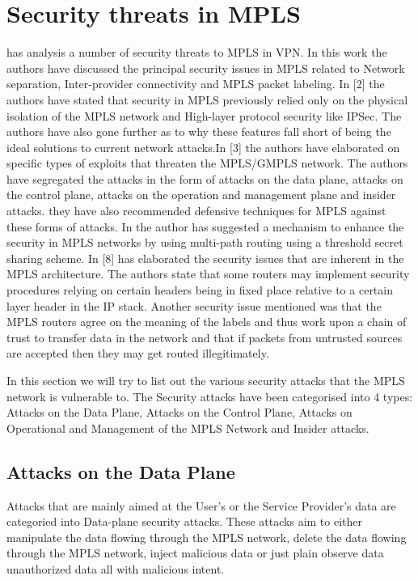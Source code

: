 \section{Security threats in MPLS}
 \cite{GRAYSON2009146} has analysis a number of security threats to MPLS in VPN. In this work the authors have discussed the principal security issues in MPLS related to Network separation, Inter-provider connectivity and MPLS packet labeling. In [2] the authors have stated that security in MPLS previously relied only on the physical isolation of the MPLS network and High-layer protocol security like IPSec. The authors have also gone further as to why these features fall short of being the ideal solutions to current network attacks.In [3] the authors have elaborated on specific types of exploits that threaten the MPLS/GMPLS network. The authors have segregated the attacks in the form of attacks on the data plane, attacks on the control plane, attacks on the operation and management plane and insider attacks. they have also recommended defensive techniques for MPLS against these forms of attacks. In \cite{Alouneh2009} the author has suggested a mechanism to enhance the security in MPLS networks by using multi-path routing using a threshold secret sharing scheme. In [8] has elaborated the security issues that are inherent in the MPLS architecture. The authors state that some routers may implement security procedures relying on certain headers being in fixed place relative to a certain layer header in the IP stack. Another security issue mentioned was that the MPLS routers agree on the meaning of the labels and thus work upon a chain of trust to transfer data in the network and that if packets from untrusted sources are accepted then they may get routed illegitimately.
 
In this section we will try to list out the various security attacks that the MPLS network is vulnerable to. The Security attacks have been categorised into 4 types: Attacks on the Data Plane, Attacks on the Control Plane, Attacks on Operational and Management of the MPLS Network and Insider attacks.
    
\subsection{Attacks on the Data Plane}
Attacks that are mainly aimed at the User's or the Service Provider's data are categoried into Data-plane security attacks. These attacks aim to either manipulate the data flowing through the MPLS network, delete the data flowing through the MPLS network, inject malicious data or just plain observe data unauthorized data all with malicious intent.


